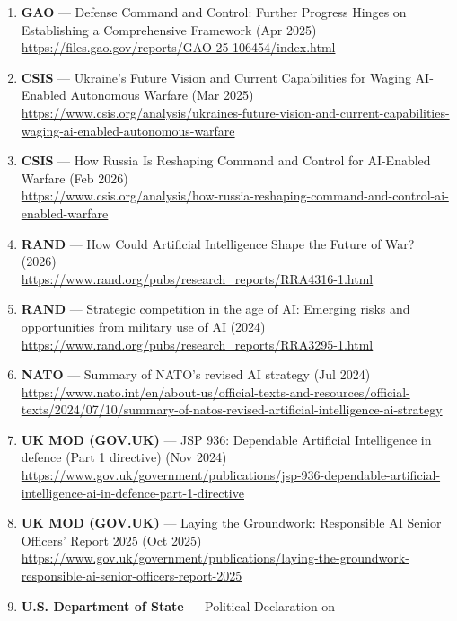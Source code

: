 \documentclass[
]{article}
\providecommand{\tightlist}{%
  \setlength{\itemsep}{0pt}\setlength{\parskip}{0pt}}
\begin{document}
\begin{enumerate}
\def\labelenumi{\arabic{enumi}.}
\setcounter{enumi}{34}
\tightlist
\item
  \textbf{GAO} --- Defense Command and Control: Further Progress Hinges
  on Establishing a Comprehensive Framework (Apr 2025)\\
  \url{https://files.gao.gov/reports/GAO-25-106454/index.html}
\item
  \textbf{CSIS} --- Ukraine's Future Vision and Current Capabilities for
  Waging AI-Enabled Autonomous Warfare (Mar 2025)\\
  \url{https://www.csis.org/analysis/ukraines-future-vision-and-current-capabilities-waging-ai-enabled-autonomous-warfare}
\item
  \textbf{CSIS} --- How Russia Is Reshaping Command and Control for
  AI-Enabled Warfare (Feb 2026)\\
  \url{https://www.csis.org/analysis/how-russia-reshaping-command-and-control-ai-enabled-warfare}
\item
  \textbf{RAND} --- How Could Artificial Intelligence Shape the Future
  of War? (2026)\\
  \url{https://www.rand.org/pubs/research_reports/RRA4316-1.html}
\item
  \textbf{RAND} --- Strategic competition in the age of AI: Emerging
  risks and opportunities from military use of AI (2024)\\
  \url{https://www.rand.org/pubs/research_reports/RRA3295-1.html}
\item
  \textbf{NATO} --- Summary of NATO's revised AI strategy (Jul 2024)\\
  \url{https://www.nato.int/en/about-us/official-texts-and-resources/official-texts/2024/07/10/summary-of-natos-revised-artificial-intelligence-ai-strategy}
\item
  \textbf{UK MOD (GOV.UK)} --- JSP 936: Dependable Artificial
  Intelligence in defence (Part 1 directive) (Nov 2024)\\
  \url{https://www.gov.uk/government/publications/jsp-936-dependable-artificial-intelligence-ai-in-defence-part-1-directive}
\item
  \textbf{UK MOD (GOV.UK)} --- Laying the Groundwork: Responsible AI
  Senior Officers' Report 2025 (Oct 2025)\\
  \url{https://www.gov.uk/government/publications/laying-the-groundwork-responsible-ai-senior-officers-report-2025}
\item
  \textbf{U.S. Department of State} --- Political Declaration on

\end{enumerate}
\end{document}
